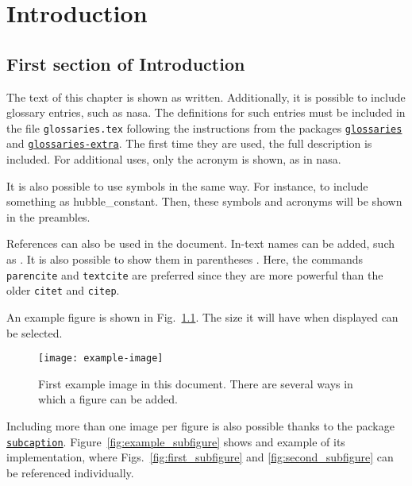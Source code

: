 \chapter[\MakeUppercase{Introduction}]{Introduction}\label{chap:chapter_01}
\pagestyle{MyThesisStyle}

\section[\MakeUppercase{First section of Introduction}]{First section of Introduction}\label{sec:first_section}

The text of this chapter is shown as written. Additionally, it is possible to include glossary entries, such as \gls{nasa}. The definitions for such entries must be included in the file \texttt{glossaries.tex} following the instructions from the packages \href{https://www.ctan.org/pkg/glossaries}{\texttt{glossaries}} and \href{https://ctan.org/pkg/glossaries-extra}{\texttt{glossaries-extra}}. The first time they are used, the full description is included. For additional uses, only the acronym is shown, as in \gls{nasa}.

It is also possible to use symbols in the same way. For instance, to include something as \gls{hubble_constant}. Then, these symbols and acronyms will be shown in the preambles.

References can also be used in the document. In-text names can be added, such as \textcite{MartinThrones}. It is also possible to show them in parentheses \parencite[such as:][]{whitman1855leaves}. Here, the commands \texttt{parencite} and \texttt{textcite} are preferred since they are more powerful than the older \texttt{citet} and \texttt{citep}.

An example figure is shown in Fig.~\ref{fig:example_figure_01}. The size it will have when displayed can be selected.

\begin{figure}[htbp]
    \centering
    \texttt{[image: example-image]}
    \caption[First example image]{First example image in this document. There are several ways in which a figure can be added.}
    \label{fig:example_figure_01}
\end{figure}

Including more than one image per figure is also possible thanks to the package \href{https://ctan.org/pkg/subcaption}{\texttt{subcaption}}. Figure~\ref{fig:example_subfigure} shows and example of its implementation, where Figs.~\ref{fig:first_subfigure} and \ref{fig:second_subfigure} can be referenced individually.

